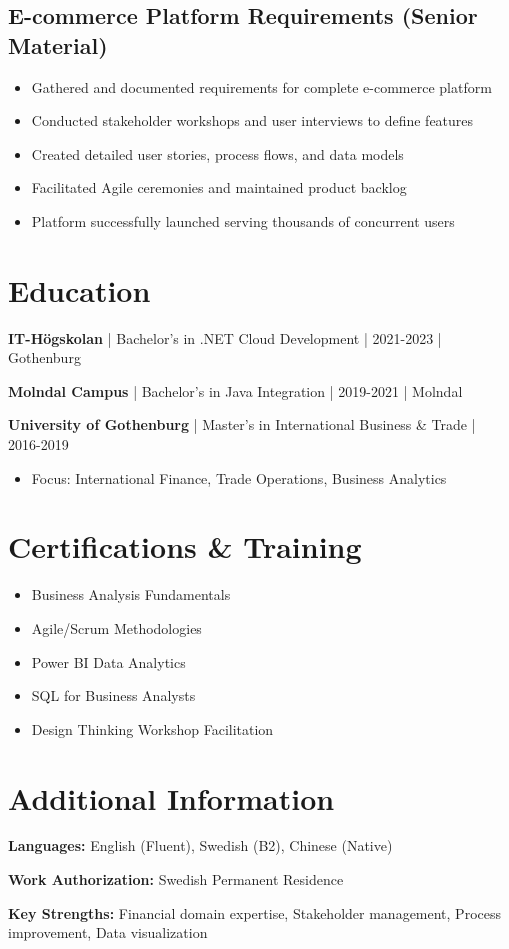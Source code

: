 \documentclass[11pt,a4paper]{article}
\begin{document}
\subsection*{E-commerce Platform Requirements (Senior Material)}
\begin{itemize}[leftmargin=*, itemsep=1pt]
\item Gathered and documented requirements for complete e-commerce platform
\item Conducted stakeholder workshops and user interviews to define features
\item Created detailed user stories, process flows, and data models
\item Facilitated Agile ceremonies and maintained product backlog
\item Platform successfully launched serving thousands of concurrent users
\end{itemize}

\section*{Education}

\textbf{IT-Högskolan} | Bachelor's in .NET Cloud Development | 2021-2023 | Gothenburg

\textbf{Molndal Campus} | Bachelor's in Java Integration | 2019-2021 | Molndal

\textbf{University of Gothenburg} | Master's in International Business \& Trade | 2016-2019
\begin{itemize}[leftmargin=*, itemsep=1pt]
\item Focus: International Finance, Trade Operations, Business Analytics
\end{itemize}

\section*{Certifications \& Training}

\begin{itemize}[leftmargin=*, itemsep=2pt]
\item Business Analysis Fundamentals
\item Agile/Scrum Methodologies
\item Power BI Data Analytics
\item SQL for Business Analysts
\item Design Thinking Workshop Facilitation
\end{itemize}

\section*{Additional Information}

\textbf{Languages:} English (Fluent), Swedish (B2), Chinese (Native)

\textbf{Work Authorization:} Swedish Permanent Residence

\textbf{Key Strengths:} Financial domain expertise, Stakeholder management, Process improvement, Data visualization
\end{document}
